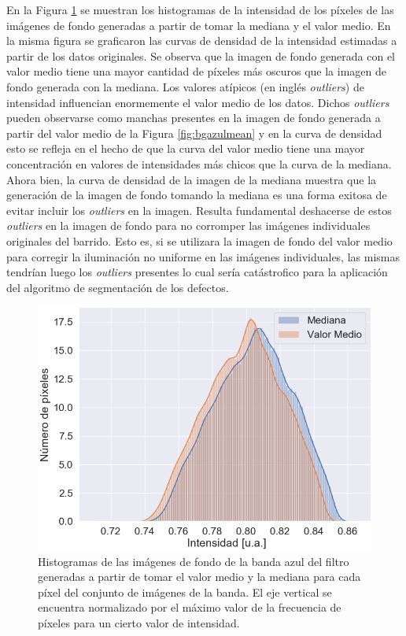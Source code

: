 En la Figura \ref{fig:comparhists} se muestran los histogramas de la intensidad de los píxeles de las imágenes de fondo generadas a partir de tomar la mediana y el valor medio. En la misma figura se graficaron las curvas de densidad de la intensidad estimadas a partir de los datos originales. Se observa que la imagen de fondo generada con el valor medio tiene una mayor cantidad de píxeles más oscuros que la imagen de fondo generada con la mediana. Los valores atípicos (en inglés \textit{outliers}) de intensidad influencian enormemente el valor medio de los datos. Dichos \textit{outliers} pueden observarse como manchas presentes en la imagen de fondo generada a partir del valor medio de la Figura \ref{fig:bgazulmean} y en la curva de densidad esto se refleja en el hecho de que la curva del valor medio tiene una mayor concentración en valores de intensidades más chicos que la curva de la mediana. Ahora bien, la curva de densidad de la imagen de la mediana muestra que la generación de la imagen de fondo tomando la mediana es una forma exitosa de evitar incluir los \textit{outliers} en la imagen. Resulta fundamental deshacerse de estos \textit{outliers} en la imagen de fondo para no corromper las imágenes individuales originales del barrido. Esto es, si se utilizara la imagen de fondo del valor medio para corregir la iluminación no uniforme en las imágenes individuales, las mismas tendrían luego los \textit{outliers} presentes lo cual sería catástrofico para la aplicación del algoritmo de segmentación de los defectos.
\begin{figure}[H]
	\centering
\includegraphics[scale=0.55]{Figs/defectosZEISS/comparhistsmedi.png}
\caption{Histogramas de las imágenes de fondo de la banda azul del filtro generadas a partir de tomar el valor medio y la mediana para cada píxel del conjunto de imágenes de la banda. El eje vertical se encuentra normalizado por el máximo valor de la frecuencia de píxeles para un cierto valor de intensidad.}
\label{fig:comparhists}
\end{figure}	
	

